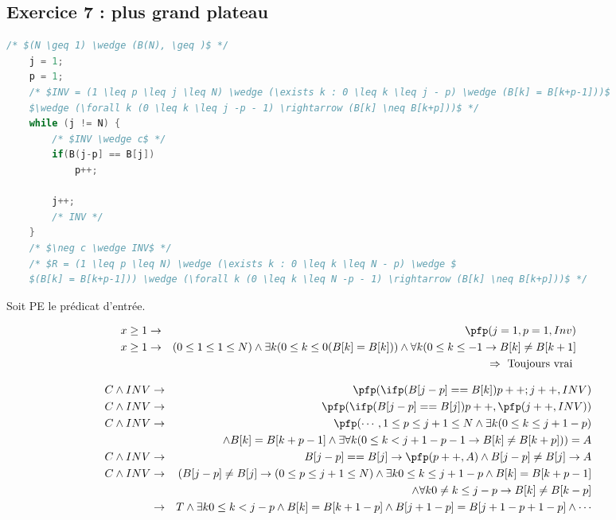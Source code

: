 \subsection{Exercice 7 : plus grand plateau}
\begin{lstlisting}[language=C]
	/* $(N \geq 1) \wedge (B(N), \geq )$ */
	j = 1;
	p = 1;
	/* $INV = (1 \leq p \leq j \leq N) \wedge (\exists k : 0 \leq k \leq j - p) \wedge (B[k] = B[k+p-1]))$
	$\wedge (\forall k (0 \leq k \leq j -p - 1) \rightarrow (B[k] \neq B[k+p]))$ */
	while (j != N) {
		/* $INV \wedge c$ */
		if(B(j-p] == B[j]) 
			p++;

		j++;
		/* INV */
	}
	/* $\neg c \wedge INV$ */
	/* $R = (1 \leq p \leq N) \wedge (\exists k : 0 \leq k \leq N - p) \wedge $
	$(B[k] = B[k+p-1])) \wedge (\forall k (0 \leq k \leq N -p - 1) \rightarrow (B[k] \neq B[k+p]))$ */
\end{lstlisting}

Soit PE le prédicat d'entrée.


\begin{eqnarray*}
	x \geq 1 &\rightarrow& \pfp (j=1,p=1, Inv)\\
	x \geq 1 &\rightarrow& (0 \leq 1 \leq 1 \leq N)\wedge \exists k(0 \leq k \leq 0 (B[k]=B[k])) \wedge \forall k(0 \leq k \leq -1 \rightarrow B[k] \neq B[k+1]\\
	&& \Rightarrow \textrm{ Toujours vrai }
\end{eqnarray*}

\begin{eqnarray*}
	C \wedge INV &\rightarrow& \pfp (\ifp (B[j-p] == B[k]) p++;j++,INV)\\
	C \wedge INV &\rightarrow& \pfp (\ifp(B[j-p] == B[j]) p++, \pfp(j++, INV))\\
	C \wedge INV &\rightarrow& \pfp(\cdots
	, 1 \leq p \leq j+1 \leq N \wedge \exists k (0 \leq k\leq j + 1 - p)\\&&
			\wedge B[k] = B[k+p-1] \wedge \exists \forall k(0 \leq k < j+1-p-1 \rightarrow B[k] \neq B[k+p] )) = A\\
C \wedge INV &\rightarrow& B[j-p] == B[j] \rightarrow \pfp (p++, A) \wedge B[j-p]  \neq B[j] \rightarrow A\\
C \wedge INV &\rightarrow& (B[j-p] \neq B[j] \rightarrow (0 \leq p \leq j+1 \leq N) \wedge \exists k 0 \leq k \leq j+1-p \wedge B[k] = B[k+p-1] \\&&
\wedge \forall k 0 \neq k \leq j-p \rightarrow B[k] \neq B[k-p]\\
&\rightarrow& T \wedge \exists k 0 \leq k< j-p \wedge B[k] = B[k+1-p] \wedge B[j+1-p] = B[j+1-p+1-p] \wedge \cdots\\
\end{eqnarray*}
